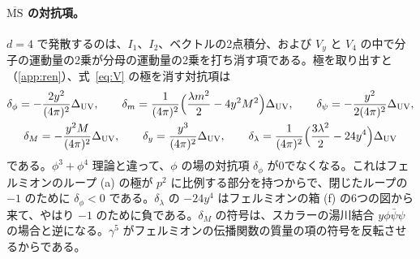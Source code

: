 \documentclass[a4paper,10pt]{ltjsarticle}
\newcommand{\MSbar}{\overline{\mathrm{MS}}}
\begin{document}
\paragraph{$\MSbar$ の対抗項。}$d=4$ で発散するのは、$I_1$、$I_2$、ベクトルの2点積分、および $V_y$ と $V_4$ の中で分子の運動量の2乗が分母の運動量の2乗を打ち消す項である。極を取り出すと（\ref{app:ren}）、式~\eqref{eq:V} の極を消す対抗項は
\begin{equation}
\begin{gathered}
\delta_\phi=-\frac{2y^2}{(4\pi)^2}\Delta_{\mathrm{UV}},\qquad
\delta_m=\frac{1}{(4\pi)^2}\Bigl(\frac{\lambda m^2}{2}-4y^2M^2\Bigr)\Delta_{\mathrm{UV}},\qquad
\delta_\psi=-\frac{y^2}{2(4\pi)^2}\Delta_{\mathrm{UV}},\\
\delta_M=-\frac{y^2M}{(4\pi)^2}\Delta_{\mathrm{UV}},\qquad
\delta_y=\frac{y^3}{(4\pi)^2}\Delta_{\mathrm{UV}},\qquad
\delta_\lambda=\frac{1}{(4\pi)^2}\Bigl(\frac{3\lambda^2}{2}-24y^4\Bigr)\Delta_{\mathrm{UV}}
\end{gathered}
\label{eq:ct}
\end{equation}
である。$\phi^3+\phi^4$ 理論と違って、$\phi$ の場の対抗項 $\delta_\phi$ が0でなくなる。これはフェルミオンのループ (a) の極が $p^2$ に比例する部分を持つからで、閉じたループの $-1$ のために $\delta_\phi<0$ である。$\delta_\lambda$ の $-24y^4$ はフェルミオンの箱 (f) の6つの図から来て、やはり $-1$ のために負である。$\delta_M$ の符号は、スカラーの湯川結合 $y\phi\bar\psi\psi$ の場合と逆になる。$\gamma^5$ がフェルミオンの伝播関数の質量の項の符号を反転させるからである。
\end{document}
